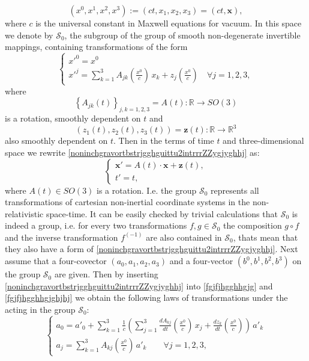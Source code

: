 \documentclass{article}
\theoremstyle{definition}
\theoremstyle{remark}
\renewcommand{\vec}[1]{\mathbf{#1}}
\newcommand{\er}{\eqref}
\newcommand{\er}{\eqref}
\begin{document}
\begin{equation}\label{fgjfjhggh}
(x^0,x^1,x^2,x^3):=(ct,x_1,x_2,x_3)=\left(ct,\vec x\right),
\end{equation}
where $c$ is the universal constant in Maxwell equations for vacuum.
In this space we denote by $\mathcal{S}_0$, the subgroup of the
group of smooth non-degenerate invertible mappings, containing
transformations of the form
\begin{equation}\label{noninchgravortbstrjgghguittu2intrrrZZygjyghhj}
\begin{cases}
x'^0=x^0
\\
x'^j=\sum\limits_{k=1}^{3}A_{jk}\left(\frac{x^0}{c}\right)\,x_k+z_j\left(\frac{x^0}{c}\right)\quad\forall
j=1,2,3,
\end{cases}
\end{equation}
where $$\left\{A_{jk}(t)\right\}_{j,k=1,2,3}=A(t):\mathbb{R}\to
SO(3)$$ is a rotation, smoothly dependent on $t$ and
$$\left(z_1(t),z_2(t),z_3(t)\right)=\vec
z(t):\mathbb{R}\to\mathbb{R}^3$$ also smoothly dependent on $t$.
Then in the terms of time $t$ and three-dimensional space we rewrite
\er{noninchgravortbstrjgghguittu2intrrrZZygjyghhj} as:
\begin{equation}\label{noninchgravortbstrjgghguittu2intrrrZZygjyg}
\begin{cases}
\vec x'=A(t)\cdot\vec x+\vec z(t),\\
t'=t,
\end{cases}
\end{equation}
where $A(t)\in SO(3)$ is a rotation. I.e. the group $\mathcal{S}_0$
represents all transformations of cartesian non-inertial coordinate
systems in the non-relativistic space-time. It can be easily checked
by trivial calculations that $\mathcal{S}_0$ is indeed a group, i.e.
for every two transformations $f,g\in\mathcal{S}_0$ the composition
$g\circ f$ and the inverse transformation $f^{(-1)}$ are also
contained in $\mathcal{S}_0$, thats mean that they also have a form
of \er{noninchgravortbstrjgghguittu2intrrrZZygjyghhj}. Next assume
that a four-covector $(a_0,a_1,a_2,a_3)$ and a four-vector
$(b^0,b^1,b^2,b^3)$ on the group $\mathcal{S}_0$ are given. Then by
inserting \er{noninchgravortbstrjgghguittu2intrrrZZygjyghhj} into
\er{fgjfjhgghhgjg} and \er{fgjfjhgghhgjghjhj} we obtain the
following laws of transformations under the acting in the group
$\mathcal{S}_0$:
\begin{equation}\label{fgjfjhgghhgjghjhjijhoj}
\begin{cases}
a_0=a'_0+\sum_{k=1}^{3}\frac{1}{c}\left(\sum\limits_{j=1}^{3}\frac{dA_{kj}}{dt}\left(\frac{x^0}{c}\right)\,x_j+\frac{d
z_k}{dt}\left(\frac{x^0}{c}\right)\right)\,a'_k
\\
a_j=\sum_{k=1}^{3}A_{kj}\left(\frac{x^0}{c}\right)\,a'_k\quad\quad\forall
j=1,2,3,
\end{cases}
\end{equation}
\end{document}
